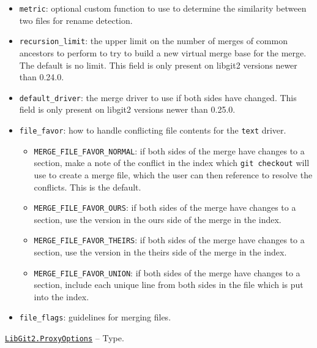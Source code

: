 \begin{adjustwidth}{2em}{0pt}
\begin{itemize}
\item \texttt{metric}: optional custom function to use to determine the similarity between two files for rename detection.


\item \texttt{recursion\_limit}: the upper limit on the number of merges of common ancestors to perform to try to build a new virtual merge base for the merge. The default is no limit. This field is only present on libgit2 versions newer than 0.24.0.


\item \texttt{default\_driver}: the merge driver to use if both sides have changed. This field is only present on libgit2 versions newer than 0.25.0.


\item \texttt{file\_favor}: how to handle conflicting file contents for the \texttt{text} driver.

\begin{itemize}
\item \texttt{MERGE\_FILE\_FAVOR\_NORMAL}: if both sides of the merge have changes to a section,  make a note of the conflict in the index which \texttt{git checkout} will use to create  a merge file, which the user can then reference to resolve the conflicts. This is  the default.


\item \texttt{MERGE\_FILE\_FAVOR\_OURS}: if both sides of the merge have changes to a section,  use the version in the {\textquotedbl}ours{\textquotedbl} side of the merge in the index.


\item \texttt{MERGE\_FILE\_FAVOR\_THEIRS}: if both sides of the merge have changes to a section,  use the version in the {\textquotedbl}theirs{\textquotedbl} side of the merge in the index.


\item \texttt{MERGE\_FILE\_FAVOR\_UNION}: if both sides of the merge have changes to a section,  include each unique line from both sides in the file which is put into the index.

\end{itemize}

\item \texttt{file\_flags}: guidelines for merging files.

\end{itemize}


\end{adjustwidth}
\hypertarget{1179613637206861638}{}
\hyperlink{1179613637206861638}{\texttt{LibGit2.ProxyOptions}}  -- {Type.}

